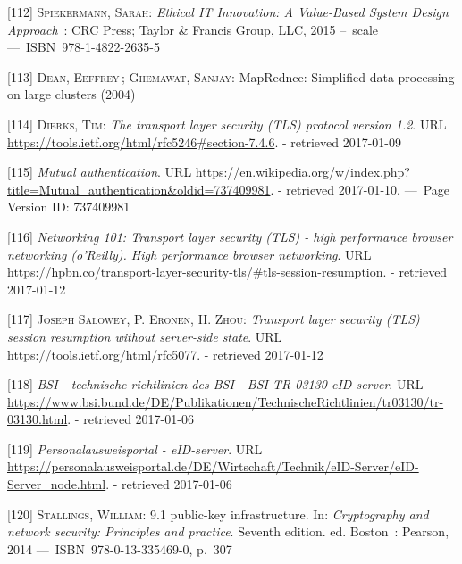 \documentclass[12pt,english,a4paper,titlepage,cleardoublepage=empty,dottedtoc]{report}
\begin{document}
\hypertarget{ref-book_2015_ethical-it-innovation}{}
{[}112{]} \textsc{Spiekermann, Sarah}: \emph{Ethical IT Innovation: A
Value-Based System Design Approach}~: CRC Press; Taylor \& Francis
Group, LLC, 2015 --~scale ---~ISBN~978-1-4822-2635-5

\hypertarget{ref-paper_2004_distributed-mapreduce}{}
{[}113{]} \textsc{Dean, Eeffrey}\,; \textsc{Ghemawat, Sanjay}:
MapRednce: Simplified data processing on large clusters (2004)

\hypertarget{ref-web_spec_tls-12_client-auth}{}
{[}114{]} \textsc{Dierks, Tim}: \emph{The transport layer security (TLS)
protocol version 1.2}. URL
\url{https://tools.ietf.org/html/rfc5246\#section-7.4.6}. - retrieved
2017-01-09

\hypertarget{ref-web_2017_wikipedia_mutual-auth}{}
{[}115{]} \emph{Mutual authentication}. URL
\url{https://en.wikipedia.org/w/index.php?title=Mutual_authentication\&oldid=737409981}.
- retrieved 2017-01-10. ---~Page Version ID: 737409981

\hypertarget{ref-book_2013_networking-101_tls-session-resumption}{}
{[}116{]} \emph{Networking 101: Transport layer security (TLS) - high
performance browser networking (o'Reilly). High performance browser
networking}. URL
\url{https://hpbn.co/transport-layer-security-tls/\#tls-session-resumption}.
- retrieved 2017-01-12

\hypertarget{ref-web_spec_tls-session-ticket-resumption}{}
{[}117{]} \textsc{Joseph Salowey, P. Eronen, \textnormal{H. Zhou}}:
\emph{Transport layer security (TLS) session resumption without
server-side state}. URL \url{https://tools.ietf.org/html/rfc5077}. -
retrieved 2017-01-12

\hypertarget{ref-web_bsi-spec_eid}{}
{[}118{]} \emph{BSI - technische richtlinien des BSI - BSI TR-03130
eID-server}. URL
\url{https://www.bsi.bund.de/DE/Publikationen/TechnischeRichtlinien/tr03130/tr-03130.html}.
- retrieved 2017-01-06

\hypertarget{ref-web_2017_npa-eid-server}{}
{[}119{]} \emph{Personalausweisportal - eID-server}. URL
\url{https://personalausweisportal.de/DE/Wirtschaft/Technik/eID-Server/eID-Server_node.html}.
- retrieved 2017-01-06

\hypertarget{ref-book_2014_chapter-10-5-asym-random-number-gen}{}
{[}120{]} \textsc{Stallings, William}: 9.1 public-key infrastructure.
In: \emph{Cryptography and network security: Principles and practice}.
Seventh edition. ed. Boston~: Pearson, 2014 ---~ISBN~978-0-13-335469-0,
p.~307
\end{document}
